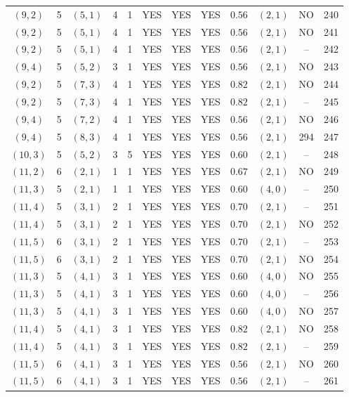 \begin{longtable}{|c|c|c|c|c|c|c|c|c|c|c|c|}
$(9,2)$ & 5 & $(5,1)$ & 4 & 1 & YES & YES & YES & $0.56$ & $(2,1)$ & NO & 240\\
$(9,2)$ & 5 & $(5,1)$ & 4 & 1 & YES & YES & YES & $0.56$ & $(2,1)$ & NO & 241\\
$(9,2)$ & 5 & $(5,1)$ & 4 & 1 & YES & YES & YES & $0.56$ & $(2,1)$ & -- & 242\\
$(9,4)$ & 5 & $(5,2)$ & 3 & 1 & YES & YES & YES & $0.56$ & $(2,1)$ & NO & 243\\
$(9,2)$ & 5 & $(7,3)$ & 4 & 1 & YES & YES & YES & $0.82$ & $(2,1)$ & NO & 244\\
$(9,2)$ & 5 & $(7,3)$ & 4 & 1 & YES & YES & YES & $0.82$ & $(2,1)$ & -- & 245\\
$(9,4)$ & 5 & $(7,2)$ & 4 & 1 & YES & YES & YES & $0.56$ & $(2,1)$ & NO & 246\\
$(9,4)$ & 5 & $(8,3)$ & 4 & 1 & YES & YES & YES & $0.56$ & $(2,1)$ & 294 & 247\\
$(10,3)$ & 5 & $(5,2)$ & 3 & 5 & YES & YES & YES & $0.60$ & $(2,1)$ & -- & 248\\
$(11,2)$ & 6 & $(2,1)$ & 1 & 1 & YES & YES & YES & $0.67$ & $(2,1)$ & NO & 249\\
$(11,3)$ & 5 & $(2,1)$ & 1 & 1 & YES & YES & YES & $0.60$ & $(4,0)$ & -- & 250\\
$(11,4)$ & 5 & $(3,1)$ & 2 & 1 & YES & YES & YES & $0.70$ & $(2,1)$ & -- & 251\\
$(11,4)$ & 5 & $(3,1)$ & 2 & 1 & YES & YES & YES & $0.70$ & $(2,1)$ & NO & 252\\
$(11,5)$ & 6 & $(3,1)$ & 2 & 1 & YES & YES & YES & $0.70$ & $(2,1)$ & -- & 253\\
$(11,5)$ & 6 & $(3,1)$ & 2 & 1 & YES & YES & YES & $0.70$ & $(2,1)$ & NO & 254\\
$(11,3)$ & 5 & $(4,1)$ & 3 & 1 & YES & YES & YES & $0.60$ & $(4,0)$ & NO & 255\\
$(11,3)$ & 5 & $(4,1)$ & 3 & 1 & YES & YES & YES & $0.60$ & $(4,0)$ & -- & 256\\
$(11,3)$ & 5 & $(4,1)$ & 3 & 1 & YES & YES & YES & $0.60$ & $(4,0)$ & NO & 257\\
$(11,4)$ & 5 & $(4,1)$ & 3 & 1 & YES & YES & YES & $0.82$ & $(2,1)$ & NO & 258\\
$(11,4)$ & 5 & $(4,1)$ & 3 & 1 & YES & YES & YES & $0.82$ & $(2,1)$ & -- & 259\\
$(11,5)$ & 6 & $(4,1)$ & 3 & 1 & YES & YES & YES & $0.56$ & $(2,1)$ & NO & 260\\
$(11,5)$ & 6 & $(4,1)$ & 3 & 1 & YES & YES & YES & $0.56$ & $(2,1)$ & -- & 261\\

\end{longtable}
